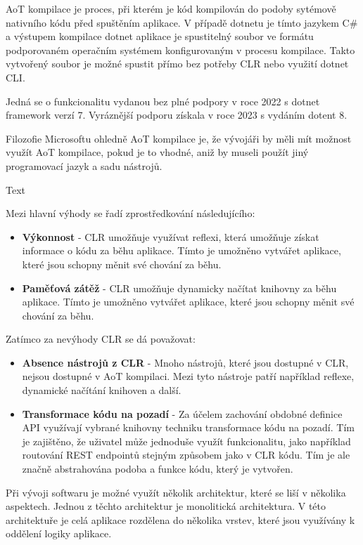 AoT kompilace je proces, při kterém je kód kompilován do podoby sytémově nativního kódu před spuštěním aplikace. V případě dotnetu je tímto jazykem C\# a výstupem kompilace dotnet aplikace je spustitelný soubor ve formátu podporovaném operačním systémem konfigurovaným v procesu kompilace. Takto vytvořený soubor je možné spustit přímo bez potřeby CLR nebo využití dotnet CLI. 

Jedná se o funkcionalitu vydanou bez plné podpory v roce 2022 s dotnet framework verzí 7. Vyráznější podporu získala v roce 2023 s vydáním dotent 8. \cite{aot}

Filozofie Microsoftu ohledně AoT kompilace je, že vývojáři by měli mít možnost využít AoT kompilace, pokud je to vhodné, aniž by museli použít jiný programovací jazyk a sadu nástrojů.

Text


Mezi hlavní výhody se řadí zprostředkování následujícího:
\begin{itemize}
    \item  \textbf{Výkonnost} - CLR umožňuje využívat reflexi, která umožňuje získat informace o kódu za běhu aplikace. Tímto je umožněno vytvářet aplikace, které jsou schopny měnit své chování za běhu.
    \item \textbf{Paměťová zátěž} - CLR umožňuje dynamicky načítat knihovny za běhu aplikace. Tímto je umožněno vytvářet aplikace, které jsou schopny měnit své chování za běhu.
\end{itemize}

Zatímco za nevýhody CLR se dá považovat:
\begin{itemize}
    \item  \textbf{Absence nástrojů z CLR} - Mnoho nástrojů, které jsou dostupné v CLR, nejsou dostupné v AoT kompilaci. Mezi tyto nástroje patří například reflexe, dynamické načítání knihoven a další.
    \item \textbf{Transformace kódu na pozadí} - Za účelem zachování obdobné definice API využívají vybrané knihovny techniku transformace kódu na pozadí. Tím je zajištěno, že uživatel může jednoduše využít funkcionalitu, jako například routování REST endpointů stejným způsobem jako v CLR kódu. Tím je ale značně abstrahována podoba a funkce kódu, který je vytvořen.
\end{itemize}

Při vývoji softwaru je možné využít několik architektur, které se liší v několika aspektech. Jednou z těchto architektur je monolitická architektura. V této architektuře je celá aplikace rozdělena do několika vrstev, které jsou využívány k oddělení logiky aplikace. \cite{monolith}

